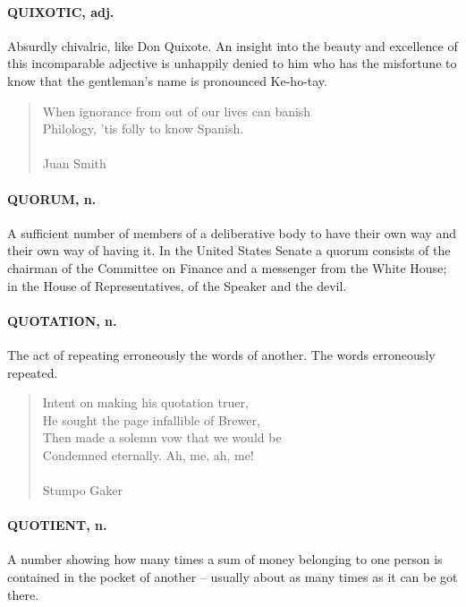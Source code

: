 \documentclass[11pt]{article}
\begin{document}
\paragraph{QUIXOTIC, adj.}  Absurdly chivalric, like Don Quixote.  An insight into
the beauty and excellence of this incomparable adjective is unhappily
denied to him who has the misfortune to know that the gentleman's name
is pronounced Ke-ho-tay.

\begin{quote}   When ignorance from out of our lives can banish \\
  Philology, 'tis folly to know Spanish. \\
 \\
Juan Smith \end{quote}


\paragraph{QUORUM, n.}  A sufficient number of members of a deliberative body to
have their own way and their own way of having it.  In the United
States Senate a quorum consists of the chairman of the Committee on
Finance and a messenger from the White House; in the House of
Representatives, of the Speaker and the devil.

\paragraph{QUOTATION, n.}  The act of repeating erroneously the words of another.
The words erroneously repeated.

\begin{quote}   Intent on making his quotation truer, \\
  He sought the page infallible of Brewer, \\
  Then made a solemn vow that we would be \\
  Condemned eternally.  Ah, me, ah, me! \\
 \\
Stumpo Gaker \end{quote}


\paragraph{QUOTIENT, n.}  A number showing how many times a sum of money belonging
to one person is contained in the pocket of another -- usually about
as many times as it can be got there.
\end{document}
